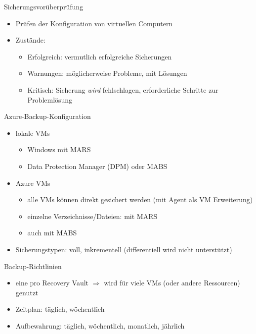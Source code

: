\begin{flashcard}[Definition]{Sicherungsvorüberprüfung}
  \begin{itemize}
    \item Prüfen der Konfiguration von virtuellen Computern
    \item Zustände:
      \begin{itemize}
        \item Erfolgreich: vermutlich erfolgreiche Sicherungen
        \item Warnungen: möglicherweise Probleme, mit Lösungen
        \item Kritisch: Sicherung \emph{wird} fehlschlagen, erforderliche Schritte zur Problemlösung
      \end{itemize}
  \end{itemize}
\end{flashcard}

\begin{flashcard}[Definition]{Azure-Backup-Konfiguration}
  \begin{itemize}
    \item lokale VMs
      \begin{itemize}
        \item Windows mit MARS
        \item Data Protection Manager (DPM) oder MABS
      \end{itemize}
    \item Azure VMs
      \begin{itemize}
        \item alle VMs können direkt gesichert werden (mit Agent als VM Erweiterung)
        \item einzelne Verzeichnisse/Dateien: mit MARS
        \item auch mit MABS
      \end{itemize}
    \item Sicherungstypen: voll, inkrementell (differentiell wird nicht unterstützt)
  \end{itemize}
\end{flashcard}

\begin{flashcard}[Definition]{Backup-Richtlinien}
  \begin{itemize}
    \item eine pro Recovery Vault\newline
      $\Rightarrow$ wird für viele VMs (oder andere Ressourcen) genutzt
    \item Zeitplan: täglich, wöchentlich
    \item Aufbewahrung: täglich, wöchentlich, monatlich, jährlich
  \end{itemize}
\end{flashcard}

